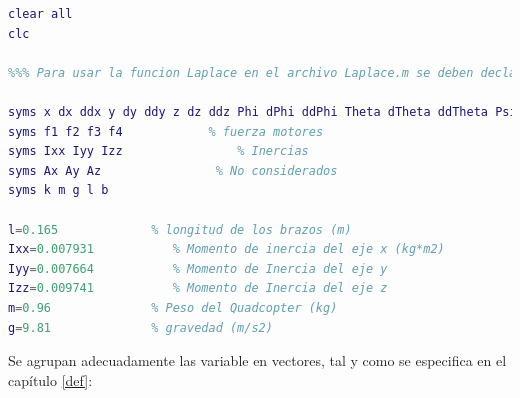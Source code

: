 \documentclass[twoside,11pt]{book}
\begin{document}
\singlespacing
\begin{lstlisting}[language=Matlab]
clear all
clc

%%% Para usar la funcion Laplace en el archivo Laplace.m se deben declarar las variables de esta manera:

syms x dx ddx y dy ddy z dz ddz Phi dPhi ddPhi Theta dTheta ddTheta Psi dPsi ddPsi
syms f1 f2 f3 f4 		    % fuerza motores
syms Ixx Iyy Izz				% Inercias
syms Ax Ay Az                % No considerados
syms k m g l b

l=0.165             % longitud de los brazos (m)
Ixx=0.007931           % Momento de inercia del eje x (kg*m2) 
Iyy=0.007664           % Momento de Inercia del eje y
Izz=0.009741           % Momento de Inercia del eje z
m=0.96              % Peso del Quadcopter (kg)
g=9.81              % gravedad (m/s2)
\end{lstlisting}

Se agrupan adecuadamente las variable en vectores, tal y como se especifica en el capítulo \ref{def}:
\end{document}
